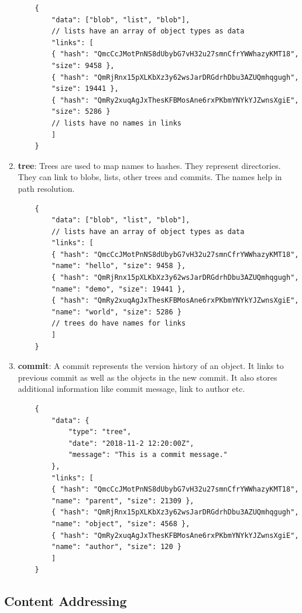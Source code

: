 \begin{enumerate}
    \begin{verbatim}
    {
        "data": ["blob", "list", "blob"],
        // lists have an array of object types as data
        "links": [
        { "hash": "QmcCcJMotPnNS8dUbybG7vH32u27smnCfrYWWhazyKMT18",
        "size": 9458 },
        { "hash": "QmRjRnx15pXLKbXz3y62wsJarDRGdrhDbu3AZUQmhqgugh",
        "size": 19441 },
        { "hash": "QmRy2xuqAgJxThesKFBMosAne6rxPKbmYNYkYJZwnsXgiE",
        "size": 5286 }
        // lists have no names in links
        ]
    }
    \end{verbatim}
    \item \textbf{tree}: Trees are used to map names to hashes. They represent directories. They can link to blobs, lists, other trees and commits. The names help in path resolution.
    \begin{verbatim}
    {
        "data": ["blob", "list", "blob"],
        // lists have an array of object types as data
        "links": [
        { "hash": "QmcCcJMotPnNS8dUbybG7vH32u27smnCfrYWWhazyKMT18",
        "name": "hello", "size": 9458 },
        { "hash": "QmRjRnx15pXLKbXz3y62wsJarDRGdrhDbu3AZUQmhqgugh",
        "name": "demo", "size": 19441 },
        { "hash": "QmRy2xuqAgJxThesKFBMosAne6rxPKbmYNYkYJZwnsXgiE",
        "name": "world", "size": 5286 }
        // trees do have names for links
        ]
    }
    \end{verbatim}
    \item \textbf{commit}: A commit represents the version history of an object. It links to previous commit as well as the objects in the new commit. It also stores additional information like commit message, link to author etc.
    \begin{verbatim}
    {
        "data": {
            "type": "tree",
            "date": "2018-11-2 12:20:00Z",
            "message": "This is a commit message."
        },
        "links": [
        { "hash": "QmcCcJMotPnNS8dUbybG7vH32u27smnCfrYWWhazyKMT18",
        "name": "parent", "size": 21309 },
        { "hash": "QmRjRnx15pXLKbXz3y62wsJarDRGdrhDbu3AZUQmhqgugh",
        "name": "object", "size": 4568 },
        { "hash": "QmRy2xuqAgJxThesKFBMosAne6rxPKbmYNYkYJZwnsXgiE",
        "name": "author", "size": 120 }
        ]
    }
    \end{verbatim}
\end{enumerate}

\subsection{Content Addressing}


